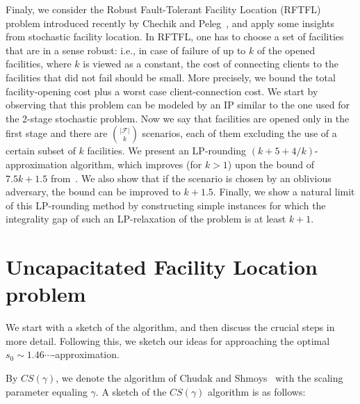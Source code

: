 \documentclass[11pt]{article}
\begin{document}
Finaly, we consider the Robust Fault-Tolerant Facility Location (RFTFL) problem
introduced recently by Chechik and Peleg~\cite{DBLP:conf/stacs/ChechikP10}, 
and apply some insights from stochastic facility location. 
In RFTFL, one has to choose a set of facilities that are in a sense robust: 
i.e., in case of
failure of up to $k$ of the opened facilities, where $k$ is viewed as
a constant, the cost of connecting clients
to the facilities that did not fail should be small. More precisely,
we bound the total facility-opening cost plus a worst case client-connection cost.
We start by observing that this problem can be modeled by an IP 
similar to the one used for the 2-stage stochastic problem. Now we say that facilities
are opened only in the first stage and there are $|\mathcal{F}| \choose k$ scenarios,
each of them excluding the use of a certain subset of $k$ facilities.
We present an LP-rounding $(k+5+4/k)$-approximation algorithm,
which improves (for $k > 1$) upon the bound of $7.5k + 1.5$ from~\cite{DBLP:conf/stacs/ChechikP10}.
We also show that if the scenario is chosen by an oblivious 
adversary, the bound can be improved to $k + 1.5$.
Finally, we show a natural limit of this LP-rounding method
by constructing simple instances for which the integrality gap of such an
LP-relaxation of the problem is at least $k+1$.

\section{Uncapacitated Facility Location problem}



We start with a sketch of the algorithm, and then discuss the crucial 
steps in more detail. Following this, we sketch our ideas for approaching
the optimal $s_0 \sim 1.46\cdots$-approximation. 

By $CS(\gamma)$, we denote the algorithm of 
Chudak and Shmoys~\cite{DBLP:journals/siamcomp/ChudakS03}
with the scaling parameter equaling $\gamma$. A sketch of the 
$CS(\gamma)$ algorithm is as follows: 
\end{document}
